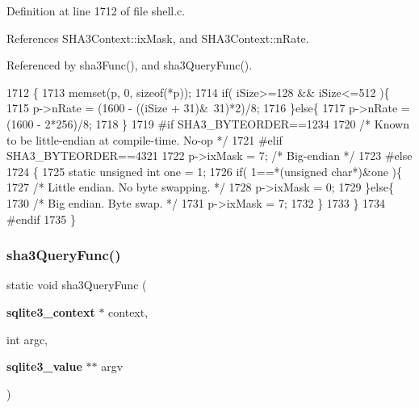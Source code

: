 Definition at line 1712 of file shell.\+c.



References S\+H\+A3\+Context\+::ix\+Mask, and S\+H\+A3\+Context\+::n\+Rate.



Referenced by sha3\+Func(), and sha3\+Query\+Func().


\begin{DoxyCode}
1712                                                \{
1713   memset(p, 0, \textcolor{keyword}{sizeof}(*p));
1714   \textcolor{keywordflow}{if}( iSize>=128 && iSize<=512 )\{
1715     p->nRate = (1600 - ((iSize + 31)&~31)*2)/8;
1716   \}\textcolor{keywordflow}{else}\{
1717     p->nRate = (1600 - 2*256)/8;
1718   \}
1719 \textcolor{preprocessor}{#if SHA3\_BYTEORDER==1234}
1720   \textcolor{comment}{/* Known to be little-endian at compile-time. No-op */}
1721 \textcolor{preprocessor}{#elif SHA3\_BYTEORDER==4321}
1722   p->ixMask = 7;  \textcolor{comment}{/* Big-endian */}
1723 \textcolor{preprocessor}{#else}
1724   \{
1725     \textcolor{keyword}{static} \textcolor{keywordtype}{unsigned} \textcolor{keywordtype}{int} one = 1;
1726     \textcolor{keywordflow}{if}( 1==*(\textcolor{keywordtype}{unsigned} \textcolor{keywordtype}{char}*)&one )\{
1727       \textcolor{comment}{/* Little endian.  No byte swapping. */}
1728       p->ixMask = 0;
1729     \}\textcolor{keywordflow}{else}\{
1730       \textcolor{comment}{/* Big endian.  Byte swap. */}
1731       p->ixMask = 7;
1732     \}
1733   \}
1734 \textcolor{preprocessor}{#endif}
1735 \}
\end{DoxyCode}
\mbox{\label{shell_8c_a45605123477af036a543563ae898a111}} 
\subsubsection{sha3\+Query\+Func()}
{\footnotesize\ttfamily static void sha3\+Query\+Func (\begin{DoxyParamCaption}\item[{\textbf{ sqlite3\+\_\+context} $\ast$}]{context,  }\item[{int}]{argc,  }\item[{\textbf{ sqlite3\+\_\+value} $\ast$$\ast$}]{argv }\end{DoxyParamCaption})\hspace{0.3cm}{\ttfamily [static]}}



